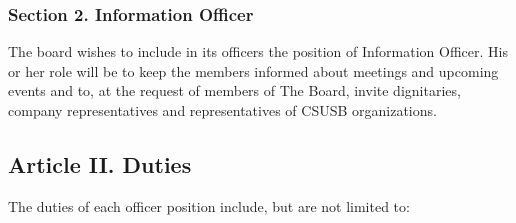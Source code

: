 \documentclass{article}
\begin{document}
    \subsubsection{Section 2. Information Officer}
      The board wishes to include in its officers the position of Information Officer. His or her role will be to keep the members informed about meetings and upcoming events and to, at the request of members of The Board, invite dignitaries, company representatives and representatives of CSUSB organizations.

  \subsection{Article II. Duties}
    The duties of each officer position include, but are not limited to:
\end{document}
